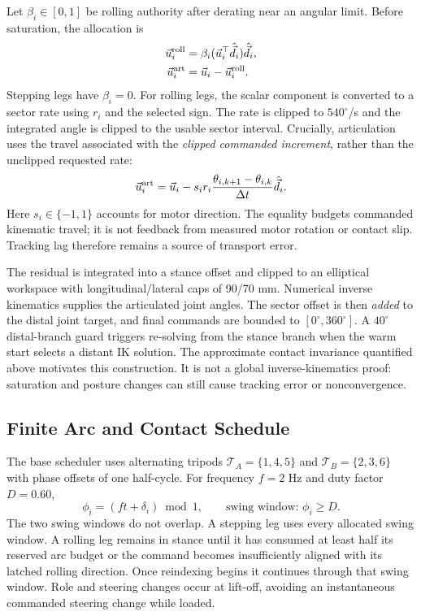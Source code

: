 \documentclass[letterpaper,10pt,conference]{ieeeconf}
\newcommand{\vct}[1]{\vec{#1}}
\begin{document}
Let $\beta_i\in[0,1]$ be rolling authority after derating near an angular limit. Before saturation, the allocation is
\begin{align}
 \vct{u}^{\rm roll}_i&=\beta_i(\vct{u}_i^\top\hat{\vct{d}}_i)\hat{\vct{d}}_i,\\
 \vct{u}^{\rm art}_i&=\vct{u}_i-\vct{u}^{\rm roll}_i.\label{eq:split}
\end{align}
Stepping legs have $\beta_i=0$. For rolling legs, the scalar component is converted to a sector rate using $r_i$ and the selected sign. The rate is clipped to $540^\circ$/s and the integrated angle is clipped to the usable sector interval. Crucially, articulation uses the travel associated with the \emph{clipped commanded increment}, rather than the unclipped requested rate:
\begin{equation}
 \vct{u}^{\rm art}_i=\vct{u}_i-
 s_i r_i\frac{\theta_{i,k+1}-\theta_{i,k}}{\Delta t}\hat{\vct{d}}_i.\label{eq:clipped}
\end{equation}
Here $s_i\in\{-1,1\}$ accounts for motor direction. The equality budgets commanded kinematic travel; it is not feedback from measured motor rotation or contact slip. Tracking lag therefore remains a source of transport error.

The residual is integrated into a stance offset and clipped to an elliptical workspace with longitudinal/lateral caps of 90/70 mm. Numerical inverse kinematics supplies the articulated joint angles. The sector offset is then \emph{added} to the distal joint target, and final commands are bounded to $[0^\circ,360^\circ]$. A $40^\circ$ distal-branch guard triggers re-solving from the stance branch when the warm start selects a distant IK solution. The approximate contact invariance quantified above motivates this construction. It is not a global inverse-kinematics proof: saturation and posture changes can still cause tracking error or nonconvergence.

\subsection{Finite Arc and Contact Schedule}
The base scheduler uses alternating tripods $\mathcal T_A=\{1,4,5\}$ and $\mathcal T_B=\{2,3,6\}$ with phase offsets of one half-cycle. For frequency $f=2$ Hz and duty factor $D=0.60$,
\begin{equation}
 \phi_i=(ft+\delta_i)\bmod1,\qquad
 \text{swing window: }\phi_i\ge D.
\end{equation}
The two swing windows do not overlap. A stepping leg uses every allocated swing window. A rolling leg remains in stance until it has consumed at least half its reserved arc budget or the command becomes insufficiently aligned with its latched rolling direction. Once reindexing begins it continues through that swing window. Role and steering changes occur at lift-off, avoiding an instantaneous commanded steering change while loaded.
\end{document}
